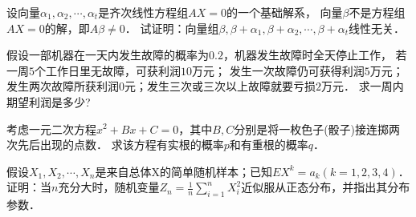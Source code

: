 \documentclass[plain,noanswer,medmath]{../../template/jnuexam}
\begin{document}

\begin{problem}
设向量$\alpha_1,\alpha_2, \cdots ,\alpha_t$是齐次线性方程组$AX = 0$的一个基础解系，
向量$\beta$不是方程组$AX = 0$的解，即$A\beta \ne 0$．
试证明：向量组$\beta ,\beta + \alpha_1,\beta + \alpha_2, \cdots ,\beta + \alpha_t$线性无关．
\end{problem}



\begin{problem}
假设一部机器在一天内发生故障的概率为$0.2$，机器发生故障时全天停止工作，
若一周$5$个工作日里无故障，可获利润$10$万元；
发生一次故障仍可获得利润$5$万元；发生两次故障所获利润$0$元；发生三次或三次以上故障就要亏损$2$万元．
求一周内期望利润是多少?
\end{problem}



\begin{problem}
考虑一元二次方程$x^2 + Bx + C = 0$，其中$B,C$分别是将一枚色子(骰子)接连掷两次先后出现的点数．
求该方程有实根的概率$p$和有重根的概率$q$．
\end{problem}



\begin{problem}
假设$X_1,X_2, \cdots ,X_n$是来自总体X的简单随机样本；已知$EX^k = a_k(k = 1,2,3,4)$．
证明：当$n$充分大时，随机变量$Z_n = \frac{1}{n}\sum_{i = 1}^n X_i^2$近似服从正态分布，并指出其分布参数．
\end{problem}
\end{document}
